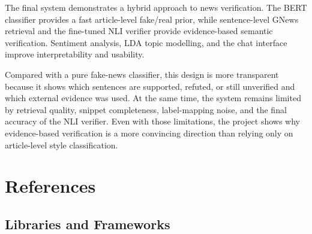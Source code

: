 \documentclass[11pt]{article}
\begin{document}
The final system demonstrates a hybrid approach to news verification. The BERT
classifier provides a fast article-level fake/real prior, while sentence-level
GNews retrieval and the fine-tuned NLI verifier provide evidence-based semantic
verification. Sentiment analysis, LDA topic modelling, and the chat interface
improve interpretability and usability.

Compared with a pure fake-news classifier, this design is more transparent
because it shows which sentences are supported, refuted, or still unverified and
which external evidence was used. At the same time, the system remains limited
by retrieval quality, snippet completeness, label-mapping noise, and the final
accuracy of the NLI verifier. Even with those limitations, the project shows why
evidence-based verification is a more convincing direction than relying only on
article-level style classification.

\section{References}

\subsection{Libraries and Frameworks}
\end{document}
